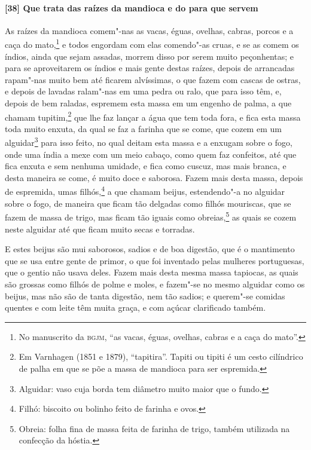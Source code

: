 \paragraph{[38] Que trata das raízes da mandioca e do para que servem}\quad
As raízes da mandioca comem"-nas as vacas, éguas, ovelhas, cabras, porcos e a caça do
mato,\footnote{ No manuscrito da \textsc{bgjm}, ``as vacas, éguas, ovelhas, cabras e a
caça do mato''.} e todos engordam com elas comendo"-as cruas, e se as comem os índios,
ainda que sejam assadas, morrem disso por serem muito peçonhentas; e para se aproveitarem
os índios e mais gente destas raízes, depois de arrancadas rapam"-nas muito bem até ficarem
alvíssimas, o que fazem com cascas de ostras, e depois de lavadas ralam"-nas em uma pedra
ou ralo, que para isso têm, e, depois de bem raladas, espremem esta massa em um engenho de
palma, a que chamam tupitim,\footnote{ Em Varnhagen (1851 e 1879), ``tapitira''. Tapiti ou
tipiti é um cesto cilíndrico de palha em que se põe a massa de mandioca para ser
espremida.} que lhe faz lançar a água que tem toda fora, e fica esta massa toda muito
enxuta, da qual se faz a farinha que se come, que cozem em um alguidar\footnote{ Alguidar:
vaso cuja borda tem diâmetro muito maior que o fundo.} para isso feito, no qual deitam
esta massa e a enxugam sobre o fogo, onde uma índia a mexe com um meio cabaço, como quem
faz confeitos, até que fica enxuta e sem nenhuma umidade, e fica como cuscuz, mas mais
branca, e desta maneira se come, é muito doce e saborosa. Fazem mais desta massa, depois
de espremida, umas filhós,\footnote{ Filhó: biscoito ou bolinho feito de farinha e ovos.}
a que chamam beijus, estendendo"-a no alguidar sobre o fogo, de maneira que ficam tão
delgadas como filhós mouriscas, que se fazem de massa de trigo, mas ficam tão iguais como
obreias,\footnote{ Obreia: folha fina de massa feita de farinha de trigo, também utilizada
na confecção da hóstia.} as quais se cozem neste alguidar até que ficam muito secas e
torradas.

E estes beijus são mui saborosos, sadios e de boa digestão, que é o mantimento que se usa
entre gente de primor, o que foi inventado pelas mulheres portuguesas, que o gentio não
usava deles. Fazem mais desta mesma massa tapiocas, as quais são grossas como filhós de
polme e moles, e fazem"-se no mesmo alguidar como os beijus, mas não são de tanta digestão,
nem tão sadios; e querem"-se comidas quentes e com leite têm muita graça, e com açúcar
clarificado também.

